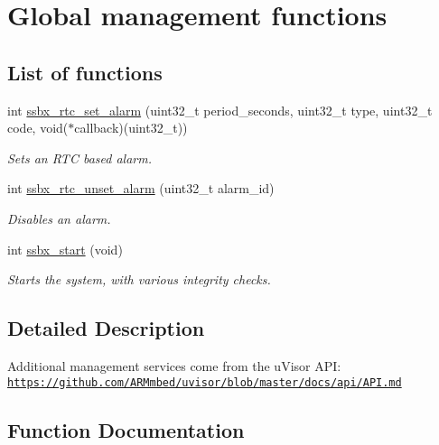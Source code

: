 \hypertarget{group__ssbx___main}{}\section{Global management functions}
\label{group__ssbx___main}
\subsection*{List of functions}
\begin{DoxyCompactItemize}
\item 
int \hyperlink{group__ssbx___main_ga242681afc2ef11a1ecff51d1fecefd2b}{ssbx\+\_\+rtc\+\_\+set\+\_\+alarm} (uint32\+\_\+t period\+\_\+seconds, uint32\+\_\+t type, uint32\+\_\+t code, void($\ast$callback)(uint32\+\_\+t))
\begin{DoxyCompactList}\small\item\em Sets an R\+TC based alarm. \end{DoxyCompactList}\item 
int \hyperlink{group__ssbx___main_gacbaeac49c40f20084b80c4d6b942a331}{ssbx\+\_\+rtc\+\_\+unset\+\_\+alarm} (uint32\+\_\+t alarm\+\_\+id)
\begin{DoxyCompactList}\small\item\em Disables an alarm. \end{DoxyCompactList}\item 
int \hyperlink{group__ssbx___main_gabade948f2d1354f81824d6dc2ea93d83}{ssbx\+\_\+start} (void)
\begin{DoxyCompactList}\small\item\em Starts the system, with various integrity checks. \end{DoxyCompactList}\end{DoxyCompactItemize}


\subsection{Detailed Description}
Additional management services come from the u\+Visor A\+PI\+: \href{https://github.com/ARMmbed/uvisor/blob/master/docs/api/API.md}{\tt https\+://github.\+com/\+A\+R\+Mmbed/uvisor/blob/master/docs/api/\+A\+P\+I.\+md} 

\subsection{Function Documentation}
\hypertarget{group__ssbx___main_ga242681afc2ef11a1ecff51d1fecefd2b}{}\label{group__ssbx___main_ga242681afc2ef11a1ecff51d1fecefd2b} 
